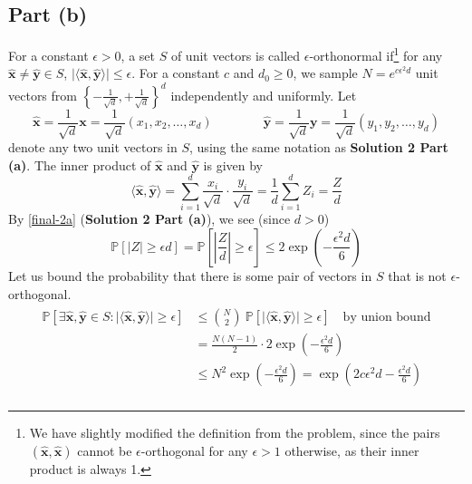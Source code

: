 \documentclass[9pt]{article}
\begin{document}
\subsection*{Part (b)}
For a constant $\epsilon > 0$, a set $S$ of unit vectors is called $\epsilon$-orthonormal if\footnote{We
have slightly modified the definition from the problem, since the pairs $(\hat{\mathbf{x}}, \hat{\mathbf{x}})$ cannot be
$\epsilon$-orthogonal for any $\epsilon > 1$ otherwise, as their inner product is always 1.} for any $\hat{\mathbf{x}} \neq \hat{\mathbf{y}} \in S$,
$\lvert \langle \hat{\mathbf{x}}, \hat{\mathbf{y}} \rangle \rvert \leq \epsilon$. For a constant $c$ and $d_{0} \geq 0$,
we sample $N = e^{c \epsilon^{2} d}$ unit vectors from $\left\{ -\frac{1}{\sqrt{d}}, +\frac{1}{\sqrt{d}} \right\}^{d}$
independently and uniformly. Let
\begin{equation}
    \hat{\mathbf{x}} = \frac{1}{\sqrt{d}} \mathbf{x} = \frac{1}{\sqrt{d}} (x_{1}, x_{2}, \dots, x_{d}) \qquad \qquad
    \hat{\mathbf{y}} = \frac{1}{\sqrt{d}} \mathbf{y} = \frac{1}{\sqrt{d}} (y_{1}, y_{2}, \dots, y_{d})
\end{equation}
denote any two unit vectors in $S$, using the same notation as \textbf{Solution 2 Part (a)}.
The inner product of $\hat{\mathbf{x}}$ and $\hat{\mathbf{y}}$ is given by
\begin{equation}
    \langle \hat{\mathbf{x}}, \hat{\mathbf{y}} \rangle = \sum_{i=1}^{d} \frac{x_{i}}{\sqrt{d}} \cdot \frac{y_{i}}{\sqrt{d}} = \frac{1}{d} \sum_{i=1}^{d} Z_{i} = \frac{Z}{d}
\end{equation}
By \eqref{final-2a} (\textbf{Solution 2 Part (a)}), we see (since $d > 0$)
\begin{equation}
    \mathbb{P}[ \lvert Z \rvert \geq \epsilon d] = \mathbb{P}\left[ \left\lvert \frac{Z}{d} \right\rvert \geq \epsilon \right]
    \leq 2 \exp{\left( -\frac{\epsilon^{2}d}{6} \right)}
\end{equation}
Let us bound the probability that there is some pair of vectors in $S$ that is not $\epsilon$-orthogonal.
\begin{align}
    \begin{split}
        \mathbb{P}[\exists \hat{\mathbf{x}}, \hat{\mathbf{y}} \in S : \lvert \langle \hat{\mathbf{x}}, \hat{\mathbf{y}} \rangle \rvert \geq \epsilon]
        &\leq \binom{N}{2} \ \mathbb{P}[ \lvert \langle \hat{\mathbf{x}}, \hat{\mathbf{y}} \rangle \rvert \geq \epsilon] \quad \text{by union bound} \\
        &= \frac{N(N-1)}{2} \cdot 2 \exp{\left( -\frac{\epsilon^{2}d}{6} \right)} \\
        &\leq N^{2} \exp{\left( -\frac{\epsilon^{2}d}{6} \right)}
        = \exp{\left( 2c \epsilon^{2} d -\frac{\epsilon^{2}d}{6} \right)} \\
    \end{split}
\end{align}
\end{document}
